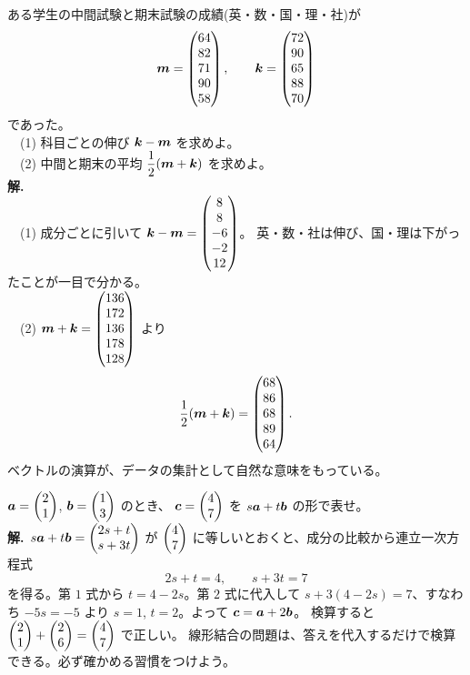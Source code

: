\begin{rei}[例題・基本(データ)]\label{rei:seiseki}
ある学生の中間試験と期末試験の成績(英・数・国・理・社)が
\[
\bm{m} = \begin{pmatrix}64 \\ 82 \\ 71 \\ 90 \\ 58\end{pmatrix}, \qquad
\bm{k} = \begin{pmatrix}72 \\ 90 \\ 65 \\ 88 \\ 70\end{pmatrix}
\]
であった。\\
　(1) 科目ごとの伸び $\bm{k} - \bm{m}$ を求めよ。\\
　(2) 中間と期末の平均 $\dfrac{1}{2}(\bm{m} + \bm{k})$ を求めよ。\\
\textbf{解.}\\
　(1) 成分ごとに引いて
$\bm{k} - \bm{m} = \begin{pmatrix}8 \\ 8 \\ -6 \\ -2 \\ 12\end{pmatrix}$。
英・数・社は伸び、国・理は下がったことが一目で分かる。\\
　(2) $\bm{m} + \bm{k} = \begin{pmatrix}136 \\ 172 \\ 136 \\ 178 \\ 128\end{pmatrix}$ より
\[
\frac{1}{2}(\bm{m} + \bm{k}) = \begin{pmatrix}68 \\ 86 \\ 68 \\ 89 \\ 64\end{pmatrix}.
\]
ベクトルの演算が、データの集計として自然な意味をもっている。
\end{rei}

\begin{rei}[例題・標準(線形結合)]
$\bm{a} = \begin{pmatrix}2 \\ 1\end{pmatrix}$, $\bm{b} = \begin{pmatrix}1 \\ 3\end{pmatrix}$ のとき、
$\bm{c} = \begin{pmatrix}4 \\ 7\end{pmatrix}$ を $s\bm{a} + t\bm{b}$ の形で表せ。\\
\textbf{解.}\ $s\bm{a} + t\bm{b} = \begin{pmatrix}2s + t \\ s + 3t\end{pmatrix}$ が
$\begin{pmatrix}4 \\ 7\end{pmatrix}$ に等しいとおくと、成分の比較から連立一次方程式
\[
2s + t = 4, \qquad s + 3t = 7
\]
を得る。第 $1$ 式から $t = 4 - 2s$。第 $2$ 式に代入して
$s + 3(4 - 2s) = 7$、すなわち $-5s = -5$ より $s = 1$, $t = 2$。よって
$\bm{c} = \bm{a} + 2\bm{b}$。
検算すると $\begin{pmatrix}2 \\ 1\end{pmatrix} + \begin{pmatrix}2 \\ 6\end{pmatrix} = \begin{pmatrix}4 \\ 7\end{pmatrix}$ で正しい。
線形結合の問題は、答えを代入するだけで検算できる。必ず確かめる習慣をつけよう。
\end{rei}

